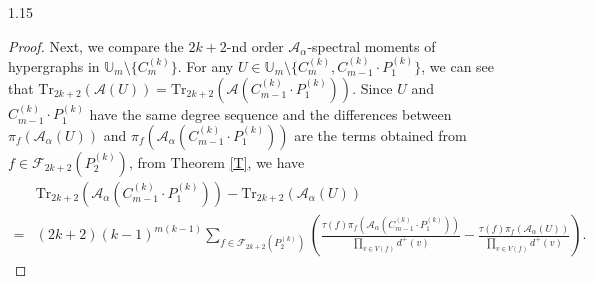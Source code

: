 \documentclass[preprint,12pt]{elsarticle1}
\numberwithin{equation}{section}
\begin{document}
\begin{spacing}{1.15}
\begin{proof}
Next, we compare the $2k+2$-nd order $\mathcal{A}_{\alpha}$-spectral moments of hypergraphs in $\mathbb{U}_{m}\setminus\{C_{m}^{(k)}\}$.
For any $U\in\mathbb{U}_{m}\setminus\{C_{m}^{(k)},C_{m-1}^{(k)}\cdot P_{1}^{(k)}\}$, we can see that $\mathrm{Tr}_{2k+2}(\mathcal{A}(U))=\mathrm{Tr}_{2k+2}(\mathcal{A}(C_{m-1}^{(k)}\cdot P_{1}^{(k)}))$.
Since $U$ and $C_{m-1}^{(k)}\cdot P_{1}^{(k)}$ have the same degree sequence and the differences between $\pi_{f}(\mathcal{A}_{\alpha}(U))$ and $\pi_{f}(\mathcal{A}_{\alpha}(C_{m-1}^{(k)}\cdot P_{1}^{(k)}))$ are the terms obtained from $f\in\mathcal{F}_{2k+2}(P_2^{(k)})$, from Theorem \ref{T}, we have
\begin{align*}
&\mathrm{Tr}_{2k+2}(\mathcal{A}_{\alpha}(C_{m-1}^{(k)}\cdot P_{1}^{(k)}))-\mathrm{Tr}_{2k+2}(\mathcal{A}_{\alpha}(U))\\
=&(2k+2)(k-1)^{m(k-1)}\sum\limits_{f\in\mathcal{F}_{2k+2}(P_2^{(k)})}\left( \frac{\tau(f)\pi_{f}(\mathcal{A}_{\alpha}(C_{m-1}^{(k)}\cdot P_{1}^{(k)}))}{\prod\limits_{v\in V(f)}d^{+}(v)} - \frac{\tau(f)\pi_{f}(\mathcal{A}_{\alpha}(U))}{\prod\limits_{v\in V(f)}d^{+}(v)} \right).
\end{align*}


\end{proof}
\end{spacing}
\end{document}
